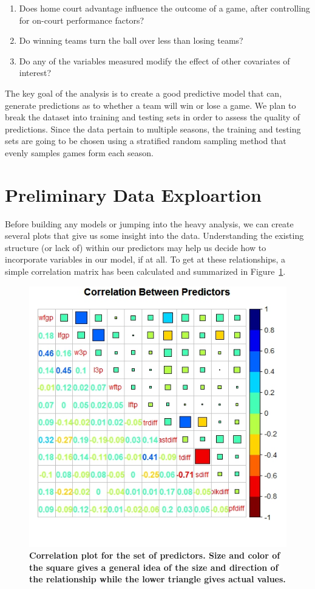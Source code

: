 \documentclass[12pt]{article}\usepackage[]{graphicx}\usepackage[]{color}
\begin{document}
\begin{enumerate}
\item %
Does home court advantage influence the outcome of a game, after controlling for on-court performance factors?

\item %
Do winning teams turn the ball over less than losing teams?

\item %
Do any of the variables measured modify the effect of other covariates of interest?

\end{enumerate}

The key goal of the analysis is to create a good predictive model that can, generate predictions as to whether a team will win or lose a game.  We plan to break the dataset into training and testing sets in order to assess the quality of predictions.  Since the data pertain to multiple seasons, the training and testing sets are going to be chosen using a stratified random sampling method that evenly samples games form each season. 

\section{Preliminary Data Exploartion}
Before building any models or jumping into the heavy analysis, we can create several plots that give us some insight into the data. Understanding the existing structure (or lack of) within our predictors may help us decide how to incorporate variables in our model, if at all. To get at these relationships, a simple correlation matrix has been calculated and summarized in Figure~\ref{fig:corr}.

\begin{figure}[h]
\centering
\includegraphics[width=.7\textwidth]{correlations.jpeg}
\captionsetup{font=footnotesize,labelfont=footnotesize}
\caption{\label{fig:corr} \textbf{Correlation plot for the set of predictors. Size and color of the square gives a general idea of the size and direction of the relationship while the lower triangle gives actual values.}}
\end{figure}
\end{document}
